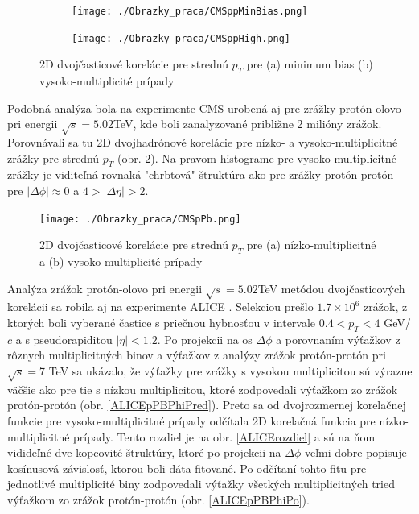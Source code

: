 \documentclass[thesismargins, thesislinespacing]{rnthesis}
\begin{document}
\begin{figure}[hbtp!]
	\centering
	\begin{subfigure}{0.5\textwidth}
		\centering
		\texttt{[image: ./Obrazky\_praca/CMSppMinBias.png]}
		\caption{}
	\end{subfigure}%
	\begin{subfigure}{0.5\textwidth}
		\centering
		\texttt{[image: ./Obrazky\_praca/CMSppHigh.png]}
		\caption{}
	\end{subfigure}
	\caption{2D dvojčasticové korelácie pre strednú $p_{T}$ pre (a) minimum bias (b) vysoko-multiplicité prípady\cite{CMSpp}}
	\label{CMSpp}
\end{figure}

Podobná analýza bola na experimente CMS urobená aj pre zrážky protón-olovo pri energii $\sqrt{s}=5.02$TeV, kde boli zanalyzované približne 2 milióny zrážok. Porovnávali sa tu 2D dvojhadrónové korelácie pre nízko- a vysoko-multiplicitné zrážky pre strednú $p_{T}$ (obr. \ref{CMSpPb}). Na pravom histograme pre vysoko-multiplicitné zrážky je viditeľná rovnaká "chrbtová" štruktúra ako pre zrážky protón-protón pre $|\Delta \phi|\approx0$  a $4>|\Delta \eta|>2$.

\begin{figure}[hbtp!]
		\centering
		\texttt{[image: ./Obrazky\_praca/CMSpPb.png]}
	\caption{2D dvojčasticové korelácie pre strednú $p_{T}$ pre (a) nízko-multiplicitné a (b) vysoko-multiplicité prípady\cite{CMSpPb}}
	\label{CMSpPb}
\end{figure}

Analýza zrážok protón-olovo pri energii $\sqrt{s}=5.02$TeV metódou dvojčasticových korelácii sa robila aj na experimente ALICE \cite{AlicepPb}. Selekciou prešlo $1.7\times10^6$ zrážok, z ktorých boli vyberané častice s priečnou hybnosťou v intervale $0.4<p_T<4$ GeV/$c$ a s pseudorapiditou $|\eta|<1.2$. Po projekcii na os $\Delta \phi$ a porovnaním výťažkov z rôznych multiplicitných binov a výťažkov z analýzy zrážok protón-protón pri $\sqrt{s}=$7 TeV sa ukázalo, že výťažky pre zrážky s vysokou multiplicitou sú výrazne väčšie ako pre tie s nízkou multiplicitou, ktoré zodpovedali výťažkom zo zrážok protón-protón (obr. \ref{ALICEpPBPhiPred}). Preto sa od dvojrozmernej korelačnej funkcie pre vysoko-multiplicitné prípady odčítala 2D korelačná funkcia pre nízko-multiplicitné prípady. Tento rozdiel je na obr. \ref{ALICErozdiel} a sú na ňom vidideľné dve kopcovité štruktúry, ktoré po projekcii na $\Delta \phi$ veľmi dobre popisuje kosínusová závislosť, ktorou boli dáta fitované. Po odčítaní tohto fitu pre jednotlivé multiplicité biny zodpovedali výťažky všetkých multiplicitných tried výťažkom zo zrážok protón-protón (obr. \ref{ALICEpPBPhiPo}).
\end{document}

